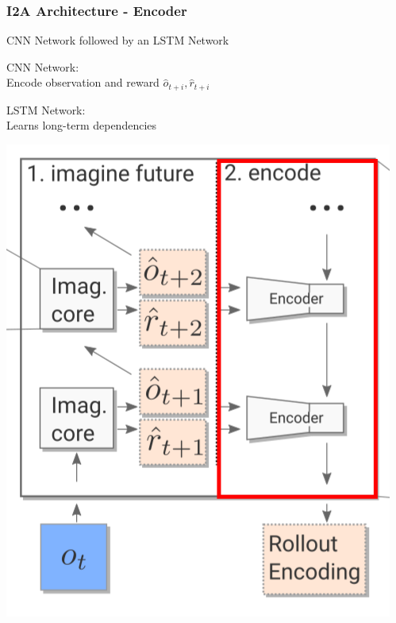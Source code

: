 \begin{frame}
    \frametitle{I2A Architecture - Encoder}

\begin{multicols}{2}
	\begin{PraesentationAufzaehlung}
		\item CNN Network followed by an LSTM Network
		\item CNN Network:\\
		Encode observation and reward $\hat{o}_{t+i}, \hat{r}_{t+i}$
		\item LSTM Network:\\
		Learns long-term dependencies
	\end{PraesentationAufzaehlung}
    \vfill\columnbreak
	\begin{center}
    \includegraphics[height=.5\textheight]{./Images/encoder.png}%
	\end{center}
\end{multicols}
    
\end{frame}
\clearpage


